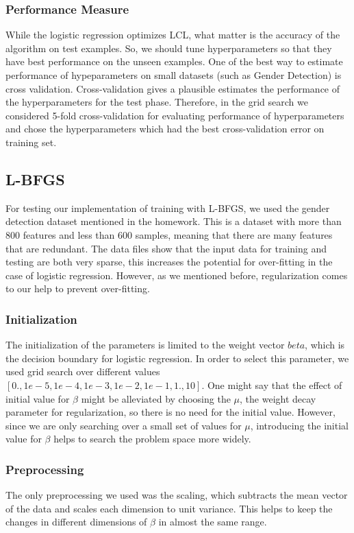 \documentclass[twoside,12pt]{article}
\begin{document}
\subsubsection{Performance Measure}
While the logistic regression optimizes LCL, what matter is the accuracy of the algorithm on test examples. So, we should tune hyperparameters so that they have best performance on the unseen examples. One of the best way to estimate performance of hypeparameters on small datasets (such as Gender Detection) is cross validation. Cross-validation gives a plausible estimates the performance of the hyperparameters for the test phase. Therefore, in the grid search we considered 5-fold cross-validation for evaluating performance of hyperparameters and chose the hyperparameters which had the best cross-validation error on training set.

\subsection{L-BFGS}
For testing our implementation of training with L-BFGS, we used the gender detection dataset mentioned in the homework. This is a dataset with more than 800 features and less than 600 samples, meaning that there are many features that are redundant. The data files show that the input data for training and testing are both very sparse, this increases the potential for over-fitting in the case of logistic regression. However, as we mentioned before, regularization comes to our help to prevent over-fitting.
\subsubsection{Initialization}
The initialization of the parameters is limited to the weight vector $beta$, which is the decision boundary for logistic regression. In order to select this parameter, we used grid search over different values $[0.,1e-5,1e-4,1e-3,1e-2,1e-1,1.,10]$. One might say that the effect of initial value for $\beta$ might be alleviated by choosing the $\mu$, the weight decay parameter for regularization, so there is no need for the initial value. However, since we are only searching over a small  set of values for $\mu$, introducing the initial value for $\beta$ helps to search the problem space more widely.
\subsubsection{Preprocessing}
The only preprocessing we used was the scaling, which subtracts the mean vector of the data and scales each dimension to unit variance. This helps to keep the changes in different dimensions of $\beta$ in almost the same range.
\end{document}
